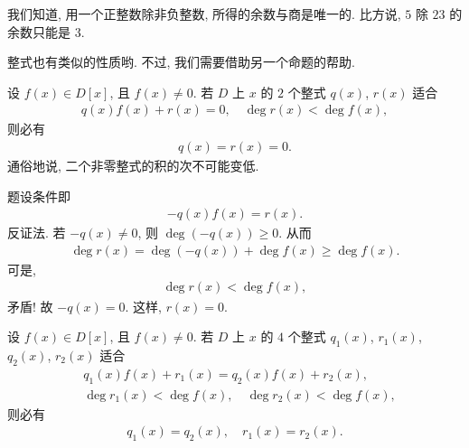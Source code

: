 我们知道, 用一个正整数除非负整数, 所得的余数与商是唯一的. 比方说, $5$ 除 $23$ 的余数只能是 $3$.

整式也有类似的性质哟. 不过, 我们需要借助另一个命题的帮助.

\begin{proposition}
    设 $f(x) \in D[x]$, 且 $f(x) \neq 0$. 若 $D$ 上 $x$ 的 $2$ 个整式 $q(x)$, $r(x)$ 适合
    \begin{align*}
        q(x) f(x) + r(x) = 0, \quad \deg r(x) < \deg f(x),
    \end{align*}
    则必有
    \begin{align*}
        q(x) = r(x) = 0.
    \end{align*}
    通俗地说, 二个非零整式的积的次不可能变低.
\end{proposition}

\begin{pf}
    题设条件即
    \begin{align*}
        -q(x) f(x) = r(x).
    \end{align*}
    反证法. 若 $-q(x) \neq 0$, 则 $\deg {(-q(x))} \geq 0$. 从而
    \begin{align*}
        \deg r(x) = \deg {(-q(x))} + \deg f(x) \geq \deg f(x).
    \end{align*}
    可是,
    \begin{align*}
        \deg r(x) < \deg f(x),
    \end{align*}
    矛盾! 故 $-q(x) = 0$. 这样, $r(x) = 0$.
\end{pf}

\begin{proposition}
    设 $f(x) \in D[x]$, 且 $f(x) \neq 0$. 若 $D$ 上 $x$ 的 $4$ 个整式 $q_1 (x)$, $r_1 (x)$, $q_2 (x)$, $r_2 (x)$ 适合
    \begin{align*}
         & q_1 (x) f(x) + r_1 (x) = q_2 (x) f(x) + r_2 (x),          \\
         & \deg r_1 (x) < \deg f(x), \quad \deg r_2 (x) < \deg f(x),
    \end{align*}
    则必有
    \begin{align*}
        q_1 (x) = q_2 (x), \quad r_1 (x) = r_2 (x).
    \end{align*}
\end{proposition}


